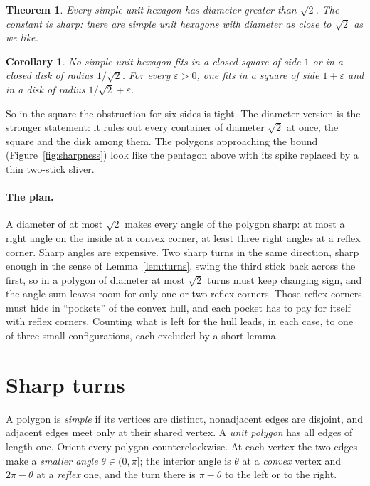 \documentclass[11pt]{article}
\newtheorem{theorem}{Theorem}
\newtheorem{corollary}{Corollary}
\theoremstyle{remark}
\begin{document}
\begin{theorem}\label{thm:main}
Every simple unit hexagon has diameter greater than $\sqrt2$. The constant is sharp:
there are simple unit hexagons with diameter as close to $\sqrt2$ as we like.
\end{theorem}

\begin{corollary}\label{cor:boxes}
No simple unit hexagon fits in a closed square of side $1$ or in a closed disk of radius
$1/\sqrt2$. For every $\varepsilon>0$, one fits in a square of side $1+\varepsilon$ and in a
disk of radius $1/\sqrt2+\varepsilon$.
\end{corollary}

So in the square the obstruction for six sides is tight. The diameter version is the
stronger statement: it rules out every container of diameter $\sqrt2$ at once, the square
and the disk among them. The polygons approaching the bound
(Figure~\ref{fig:sharpness}) look like the pentagon above with its spike replaced by a
thin two-stick sliver.

\paragraph{The plan.} A diameter of at most $\sqrt2$ makes every angle of the polygon
sharp: at most a right angle on the inside at a convex corner, at least three right
angles at a reflex corner. Sharp angles are expensive. Two sharp turns in the same
direction, sharp enough in the sense of Lemma~\ref{lem:turns}, swing the third stick back
across the first, so in a polygon of diameter at most $\sqrt2$ turns must keep changing sign, and the angle sum leaves room for only one or two reflex corners. Those reflex
corners must hide in ``pockets'' of the convex hull, and each pocket has to pay for
itself with reflex corners. Counting what is left for the hull leads, in each case, to
one of three small configurations, each excluded by a short lemma.

\section{Sharp turns}

A polygon is \emph{simple} if its vertices are distinct, nonadjacent edges are disjoint,
and adjacent edges meet only at their shared vertex. A \emph{unit polygon} has all
edges of length one. Orient every polygon counterclockwise. At each vertex the two
edges make a \emph{smaller angle} $\theta\in(0,\pi]$; the interior angle is $\theta$ at a
\emph{convex} vertex and $2\pi-\theta$ at a \emph{reflex} one, and the turn there is
$\pi-\theta$ to the left or to the right.
\end{document}
